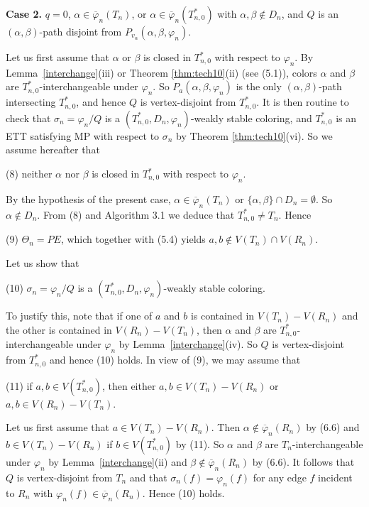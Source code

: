 \documentclass[11pt]{article}
\newcommand{\phibar}{\overline{\varphi}}
\begin{document}
{\bf Case 2.}	$q=0$, $\alpha\in\phibar_n(T_{n})$, or $\alpha\in\phibar_n(T_{n,0}^*)$ with $\alpha,\beta\notin D_n$, and 
$Q$ is an $(\alpha,\beta)$-path disjoint from $P_{v_{\alpha}}(\alpha,\beta,\varphi_n)$.  


Let us first assume that $\alpha$ or $\beta$ is closed in $T_{n,0}^*$ with respect to $\varphi_n$. By Lemma~\ref{interchange}(iii) 
or Theorem \ref{thm:tech10}(ii) (see (5.1)), colors $\alpha$ and $\beta$ are $T_{n,0}^*$-interchangeable under $\varphi_n$. 
So $P_{a}(\alpha,\beta,\varphi_n)$ is the only $(\alpha,\beta)$-path intersecting $T_{n,0}^*$, and hence $Q$ is vertex-disjoint from
$T_{n,0}^*$. It is then routine to check that $\sigma_n=\varphi_n/Q$ is a $(T_{n,0}^*, D_n,\varphi_n)$-weakly stable 
coloring, and $T_{n,0}^*$ is an ETT satisfying MP with respect to $\sigma_n$ by Theorem \ref{thm:tech10}(vi). So we assume 
hereafter that 

(8) neither $\alpha$ nor $\beta$ is closed in $T_{n,0}^*$ with respect to $\varphi_n$. 

By the hypothesis of the present case, $\alpha\in \phibar_n(T_{n})$ or $\{\alpha, \beta\} \cap D_{n}=\emptyset$.
So $\alpha\notin D_n$. From (8) and Algorithm 3.1 we deduce that $T_{n,0}^* \ne T_n$. Hence

(9) $\Theta_n=PE$, which together with (5.4) yields $a, b \notin V(T_n)\cap V(R_n)$.

Let us show that

(10) $\sigma_n=\varphi_n/Q$ is a $(T_{n,0}^*, D_n,\varphi_n)$-weakly stable coloring. 

To justify this, note that if one of $a$ and $b$ is contained in $V(T_n)-V(R_n)$ and the other is contained in
$V(R_n)-V(T_n)$, then $\alpha$ and $\beta$ are $T_{n,0}^*$-interchangeable under $\varphi_n$ by 
Lemma~\ref{interchange}(iv). So $Q$ is vertex-disjoint from $T_{n,0}^*$ and hence (10) holds. 
In view of (9), we may assume that 

(11) if $a, b \in V(T_{n,0}^*)$, then either $a, b \in V(T_n)-V(R_n)$ or $a, b \in V(R_n)-V(T_n)$.    

Let us first assume that $a\in V(T_n)-V(R_n)$. Then $\alpha \notin \phibar_n (R_n)$ by (6.6) and 
$b \in V(T_n)-V(R_n)$ if $b \in V(T_{n,0}^*)$ by (11). So $\alpha$ and $\beta$ are $T_n$-interchangeable under 
$\varphi_n$ by Lemma~\ref{interchange}(ii) and $\beta \notin \phibar_n (R_n)$ by (6.6). It follows that $Q$ is 
vertex-disjoint from $T_{n}$ and that $\sigma_n(f)=\varphi_n(f)$ for any edge $f$ incident to $R_n$ with $\varphi_n(f)\in\phibar_n(R_n)$. Hence (10) holds.   
\end{document}
